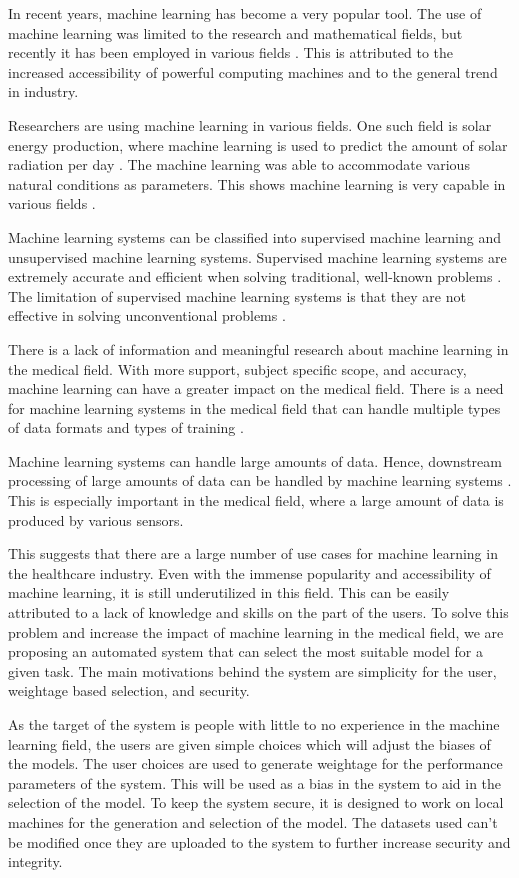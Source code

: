 \documentclass[a4paper,fleqn]{cas-dc}
\newcommand{\responsemod}{\color{blue}}
\begin{document}
{\responsemod
    In recent years, machine learning has become a very popular tool. The use of machine learning was limited to the research and mathematical fields, but recently it has been employed in various fields \cite{ref_paper_36}. This is attributed to the increased accessibility of powerful computing machines and to the general trend in industry.

    Researchers are using machine learning in various fields. One such field is solar energy production, where machine learning is used to predict the amount of solar radiation per day \cite{ref_paper_7}. The machine learning was able to accommodate various natural conditions as parameters. This shows machine learning is very capable in various fields \cite{ref_paper_10,ref_paper_29}.

    Machine learning systems can be classified into supervised machine learning and unsupervised machine learning systems. Supervised machine learning systems are extremely accurate and efficient when solving traditional, well-known problems \cite{ref_paper_21}. The limitation of supervised machine learning systems is that they are not effective in solving unconventional problems \cite{ref_paper_10}.

    There is a lack of information and meaningful research about machine learning in the medical field. With more support, subject specific scope, and accuracy, machine learning can have a greater impact on the medical field. There is a need for machine learning systems in the medical field that can handle multiple types of data formats and types of training \cite{ref_paper_24}.

    Machine learning systems can handle large amounts of data. Hence, downstream processing of large amounts of data can be handled by machine learning systems \cite{ref_paper_12}. This is especially important in the medical field, where a large amount of data is produced by various sensors.

    This suggests that there are a large number of use cases for machine learning in the healthcare industry. Even with the immense popularity and accessibility of machine learning, it is still underutilized in this field. This can be easily attributed to a lack of knowledge and skills on the part of the users. To solve this problem and increase the impact of machine learning in the medical field, we are proposing an automated system that can select the most suitable model for a given task. The main motivations behind the system are simplicity for the user, weightage based selection, and security.

    As the target of the system is people with little to no experience in the machine learning field, the users are given simple choices which will adjust the biases of the models. The user choices are used to generate weightage for the performance parameters of the system. This will be used as a bias in the system to aid in the selection of the model. To keep the system secure, it is designed to work on local machines for the generation and selection of the model. The datasets used can't be modified once they are uploaded to the system to further increase security and integrity.
}
\end{document}
